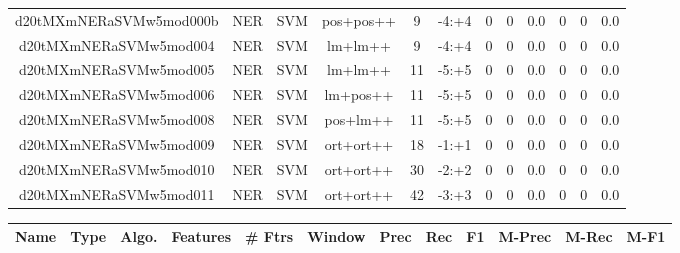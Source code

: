 \documentclass[a4paper]{article}
\begin{document}
\begin{landscape}
\begin{center}
\begin{tabular}{ |c|c|c|c|c|c|c|c|c|c|c|c|}
 
 	
 	\small{ d20tMXmNERaSVMw5mod000b } & \small{ NER} & \small{  SVM }  & pos+pos++  &  9 &  \small{  -4:+4 }  &  0 & 0 & 0.0  &  0 & 0 & 0.0 \\
 	

 
 	
 	\small{ d20tMXmNERaSVMw5mod004 } & \small{ NER} & \small{  SVM }  & lm+lm++  &  9 &  \small{  -4:+4 }  &  0 & 0 & 0.0  &  0 & 0 & 0.0 \\
 	

 
 	
 	\small{ d20tMXmNERaSVMw5mod005 } & \small{ NER} & \small{  SVM }  & lm+lm++  &  11 &  \small{  -5:+5 }  &  0 & 0 & 0.0  &  0 & 0 & 0.0 \\
 	

 
 	
 	\small{ d20tMXmNERaSVMw5mod006 } & \small{ NER} & \small{  SVM }  & lm+pos++  &  11 &  \small{  -5:+5 }  &  0 & 0 & 0.0  &  0 & 0 & 0.0 \\
 	

 
 	
 	\small{ d20tMXmNERaSVMw5mod008 } & \small{ NER} & \small{  SVM }  & pos+lm++  &  11 &  \small{  -5:+5 }  &  0 & 0 & 0.0  &  0 & 0 & 0.0 \\
 	

 
 	
 	\small{ d20tMXmNERaSVMw5mod009 } & \small{ NER} & \small{  SVM }  & ort+ort++  &  18 &  \small{  -1:+1 }  &  0 & 0 & 0.0  &  0 & 0 & 0.0 \\
 	

 
 	
 	\small{ d20tMXmNERaSVMw5mod010 } & \small{ NER} & \small{  SVM }  & ort+ort++  &  30 &  \small{  -2:+2 }  &  0 & 0 & 0.0  &  0 & 0 & 0.0 \\
 	

 
 	
 	\small{ d20tMXmNERaSVMw5mod011 } & \small{ NER} & \small{  SVM }  & ort+ort++  &  42 &  \small{  -3:+3 }  &  0 & 0 & 0.0  &  0 & 0 & 0.0 \\
 	
 \hline
\end{tabular}
\end{center}




\begin{center}
\begin{tabular}{ |c|c|c|c|c|c|c|c|c|c|c|c|} 
 \hline
 	Name & Type & Algo. & Features & \# Ftrs & Window & Prec & Rec & F1 & M-Prec & M-Rec & M-F1\\
 \hline


\end{tabular}
\end{center}
\end{landscape}
\end{document}
